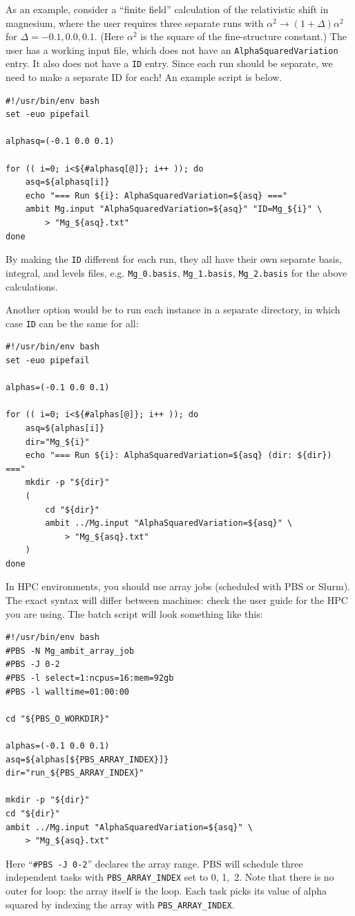 \documentclass{report}
\begin{document}
As an example, consider a ``finite field'' calculation of the relativistic shift in magnesium, where the user requires three separate runs with  $\alpha^2 \to (1 + \Delta)\alpha^2$ for $\Delta = -0.1, 0.0, 0.1$. (Here $\alpha^2$ is the square of the fine-structure constant.) The user has a working input file, which does not have an \texttt{AlphaSquaredVariation} entry. It also does not have a \texttt{ID} entry. Since each run should be separate, we need to make a separate ID for each! An example script is below.

\begin{verbatim}
#!/usr/bin/env bash
set -euo pipefail

alphasq=(-0.1 0.0 0.1)

for (( i=0; i<${#alphasq[@]}; i++ )); do
    asq=${alphasq[i]}
    echo "=== Run ${i}: AlphaSquaredVariation=${asq} ==="
    ambit Mg.input "AlphaSquaredVariation=${asq}" "ID=Mg_${i}" \
        > "Mg_${asq}.txt"
done
\end{verbatim}

By making the \texttt{ID} different for each run, they all have their own separate basis, integral, and levels files, e.g. \texttt{Mg\_0.basis}, \texttt{Mg\_1.basis}, 
\texttt{Mg\_2.basis} for the above calculations.

Another option would be to run each instance in a separate directory, in which case \texttt{ID} can be the same for all:
\begin{verbatim}
#!/usr/bin/env bash
set -euo pipefail
	
alphas=(-0.1 0.0 0.1)

for (( i=0; i<${#alphas[@]}; i++ )); do
    asq=${alphas[i]}
    dir="Mg_${i}"
    echo "=== Run ${i}: AlphaSquaredVariation=${asq} (dir: ${dir}) ==="
    mkdir -p "${dir}"
    (
        cd "${dir}"
        ambit ../Mg.input "AlphaSquaredVariation=${asq}" \
            > "Mg_${asq}.txt"
    )
done
\end{verbatim}

In HPC environments, you should use array jobs (scheduled with PBS or Slurm). The exact syntax will differ between machines: check the user guide for the HPC you are using. The batch script will look something like this:

\begin{verbatim}
#!/usr/bin/env bash
#PBS -N Mg_ambit_array_job
#PBS -J 0-2
#PBS -l select=1:ncpus=16:mem=92gb
#PBS -l walltime=01:00:00

cd "${PBS_O_WORKDIR}"

alphas=(-0.1 0.0 0.1)
asq=${alphas[${PBS_ARRAY_INDEX}]}
dir="run_${PBS_ARRAY_INDEX}"

mkdir -p "${dir}"
cd "${dir}"
ambit ../Mg.input "AlphaSquaredVariation=${asq}" \
	> "Mg_${asq}.txt"
\end{verbatim}
Here ``\texttt{\#PBS -J 0-2}'' declares the array range. PBS will schedule three independent
tasks with \texttt{PBS\_ARRAY\_INDEX} set to 0, 1, 2. Note that there is no outer for loop: the array itself is the loop. Each task picks its value of alpha squared by indexing the array with \texttt{PBS\_ARRAY\_INDEX}. 
\end{document}
